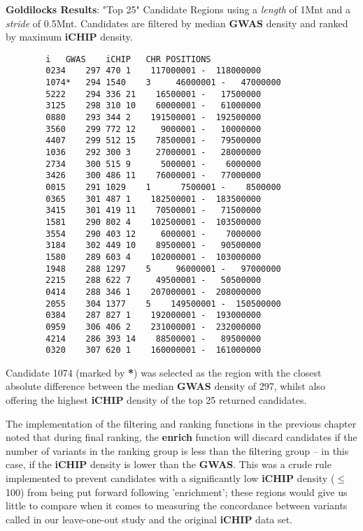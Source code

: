 \begin{listing}[H]
    \caption[resultsp2]{\textbf{Goldilocks Results}: "Top 25" Candidate Regions
    using a \textit{length} of 1Mnt and a \textit{stride} of 0.5Mnt. Candidates
    are filtered by median \textbf{GWAS} density and ranked by maximum
    \textbf{iCHIP} density.}
    \label{list:resultsp2}
    \begin{verbatim}
        i	GWAS	iCHIP	CHR	POSITIONS
        0234	297	470	1	 117000001 -  118000000
        1074*	294	1540	3	  46000001 -   47000000
        5222	294	336	21	  16500001 -   17500000
        3125	298	310	10	  60000001 -   61000000
        0880	293	344	2	 191500001 -  192500000
        3560	299	772	12	   9000001 -   10000000
        4407	299	512	15	  78500001 -   79500000
        1036	292	300	3	  27000001 -   28000000
        2734	300	515	9	   5000001 -    6000000
        3426	300	486	11	  76000001 -   77000000
        0015	291	1029	1	   7500001 -    8500000
        0365	301	487	1	 182500001 -  183500000
        3415	301	419	11	  70500001 -   71500000
        1581	290	802	4	 102500001 -  103500000
        3554	290	403	12	   6000001 -    7000000
        3184	302	449	10	  89500001 -   90500000
        1580	289	603	4	 102000001 -  103000000
        1948	288	1297	5	  96000001 -   97000000
        2215	288	622	7	  49500001 -   50500000
        0414	288	346	1	 207000001 -  208000000
        2055	304	1377	5	 149500001 -  150500000
        0384	287	827	1	 192000001 -  193000000
        0959	306	406	2	 231000001 -  232000000
        4214	286	393	14	  88500001 -   89500000
        0320	307	620	1	 160000001 -  161000000
    \end{verbatim}
\end{listing}

Candidate 1074 (marked by \textbf{*}) was selected as the region with the
closest absolute difference between the median \textbf{GWAS} density of 297,
whilst also offering the highest \textbf{iCHIP} density of the top 25 returned
candidates.


The implementation of the filtering and ranking functions in the previous
chapter noted that during final ranking, the \textbf{enrich} function will
discard candidates if the number of variants in the ranking group is less than
the filtering group -- in this case, if the \textbf{iCHIP} density is lower than
the \textbf{GWAS}. This was a crude rule implemented to prevent candidates with
a significantly low \textbf{iCHIP} density ($\le$100) from being put forward following
'enrichment'; these regions would give us little to compare when it comes to
measuring the concordance between variants called in our leave-one-out study and
the original \textbf{iCHIP} data set.

